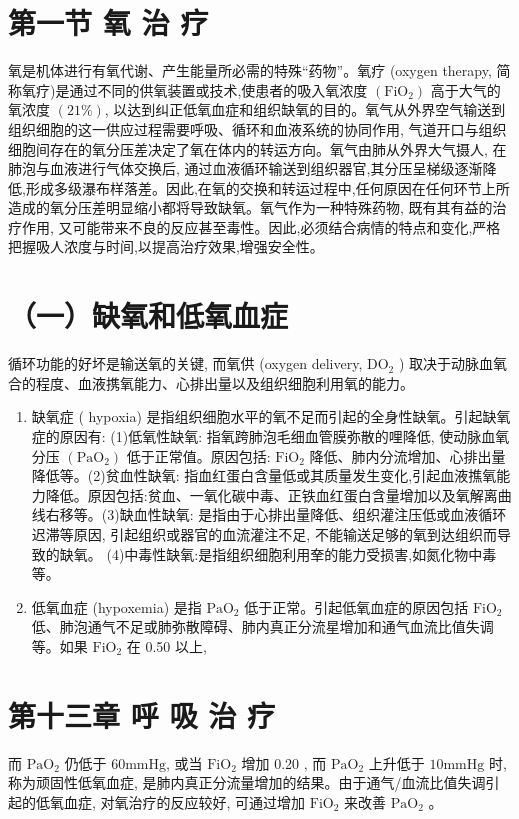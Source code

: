 \documentclass[10pt]{article}
\begin{document}
\section*{第一节 氧 治 疗}
氧是机体进行有氧代谢、产生能量所必需的特殊“药物”。氧疗 (oxygen therapy, 简称氧疗)是通过不同的供氧装置或技术,使患者的吸入氧浓度 $\left(\mathrm{FiO}_{2}\right)$ 高于大气的氧浓度 $(21 \%)$, 以达到纠正低氧血症和组织缺氧的目的。氧气从外界空气输送到组织细胞的这一供应过程需要呼吸、循环和血液系统的协同作用, 气道开口与组织细胞间存在的氧分压差决定了氧在体内的转运方向。氧气由肺从外界大气摄人, 在肺泡与血液进行气体交换后, 通过血液循环输送到组织器官,其分压呈梯级逐渐降低,形成多级瀑布样落差。因此,在氧的交换和转运过程中,任何原因在任何环节上所造成的氧分压差明显缩小都将导致缺氧。氧气作为一种特殊药物, 既有其有益的治疗作用, 又可能带来不良的反应甚至毒性。因此,必须结合病情的特点和变化,严格把握吸人浓度与时间,以提高治疗效果,增强安全性。

\section*{（一）缺氧和低氧血症}
循环功能的好坏是输送氧的关键, 而氧供 (oxygen delivery, $\mathrm{DO}_{2}$ ) 取决于动脉血氧合的程度、血液携氧能力、心排出量以及组织细胞利用氧的能力。

\begin{enumerate}
  \item 缺氧症 ( hypoxia) 是指组织细胞水平的氧不足而引起的全身性缺氧。引起缺氧症的原因有: (1)低氧性缺氧: 指氧跨肺泡毛细血管膜弥散的哩降低, 使动脉血氧分压 $\left(\mathrm{PaO}_{2}\right)$ 低于正常值。原因包括: $\mathrm{FiO}_{2}$ 降低、肺内分流增加、心排出量降低等。(2)贫血性缺氧: 指血红蛋白含量低或其质量发生变化,引起血液撨氧能力降低。原因包括:贫血、一氧化碳中毒、正铁血红蛋白含量增加以及氧解离曲线右移等。(3)缺血性缺氧: 是指由于心排出量降低、组织灌注压低或血液循环迟滞等原因, 引起组织或器官的血流灌注不足, 不能输送足够的氧到达组织而导致的缺氧。 (4)中毒性缺氧:是指组织细胞利用羍的能力受损害,如氮化物中毒等。

  \item 低氧血症 (hypoxemia) 是指 $\mathrm{PaO}_{2}$ 低于正常。引起低氧血症的原因包括 $\mathrm{FiO}_{2}$ 低、肺泡通气不足或肺弥散障碍、肺内真正分流星增加和通气血流比值失调等。如果 $\mathrm{FiO}_{2}$ 在 0.50 以上,

\end{enumerate}

\section*{第十三章 呼 吸 治 疗}
而 $\mathrm{PaO}_{2}$ 仍低于 $60 \mathrm{mmHg}$, 或当 $\mathrm{FiO}_{2}$ 增加 0.20 , 而 $\mathrm{PaO}_{2}$ 上升低于 $10 \mathrm{mmHg}$ 时, 称为顽固性低氧血症, 是肺内真正分流量增加的结果。由于通气/血流比值失调引起的低氧血症, 对氧治疗的反应较好, 可通过增加 $\mathrm{FiO}_{2}$ 来改善 $\mathrm{PaO}_{2}$ 。
\end{document}
